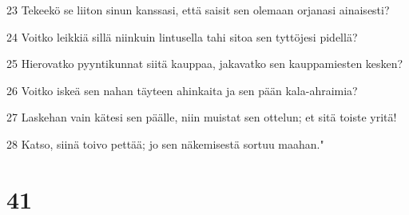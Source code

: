 \par 23 Tekeekö se liiton sinun kanssasi, että saisit sen olemaan orjanasi ainaisesti?
\par 24 Voitko leikkiä sillä niinkuin lintusella tahi sitoa sen tyttöjesi pidellä?
\par 25 Hierovatko pyyntikunnat siitä kauppaa, jakavatko sen kauppamiesten kesken?
\par 26 Voitko iskeä sen nahan täyteen ahinkaita ja sen pään kala-ahraimia?
\par 27 Laskehan vain kätesi sen päälle, niin muistat sen ottelun; et sitä toiste yritä!
\par 28 Katso, siinä toivo pettää; jo sen näkemisestä sortuu maahan."

\chapter{41}

